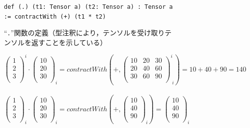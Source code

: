 \begin{figure}[t]
 \begin{subfigure}[b]{1.0\linewidth}
\begin{lstlisting}[language=egison,numbers=none]
def (.) (t1: Tensor a) (t2: Tensor a) : Tensor a := contractWith (+) (t1 * t2)
\end{lstlisting}
  \caption{``\lstinline{.}''関数の定義（型注釈により，テンソルを受け取りテンソルを返すことを示している）}
  \label{fig:dotDef}
 \end{subfigure}
  \medskip
 \begin{subfigure}[b]{1.0\linewidth}
  {\small
  $\begin{pmatrix} 1 \\ 2 \\ 3 \\ \end{pmatrix}^{i} \cdot \begin{pmatrix} 10 \\ 20 \\ 30 \\ \end{pmatrix}_{i} = contractWith(+, \begin{pmatrix} 10 & 20 & 30 \\ 20 & 40 & 60 \\ 30 & 60 & 90 \\ \end{pmatrix}^{i}_{\;i})
  = 10 + 40 + 90 = 140$
  \\ \medskip \\
  $\begin{pmatrix} 1 \\ 2 \\ 3 \\ \end{pmatrix}_{i} \cdot \begin{pmatrix} 10 \\ 20 \\ 30 \\ \end{pmatrix}_{i} = contractWith(+, \begin{pmatrix} 10 \\ 40 \\ 90 \\ \end{pmatrix}_{i}) = \begin{pmatrix} 10 \\ 40 \\ 90 \\ \end{pmatrix}_{i}$
}
\end{subfigure}
\end{figure}
